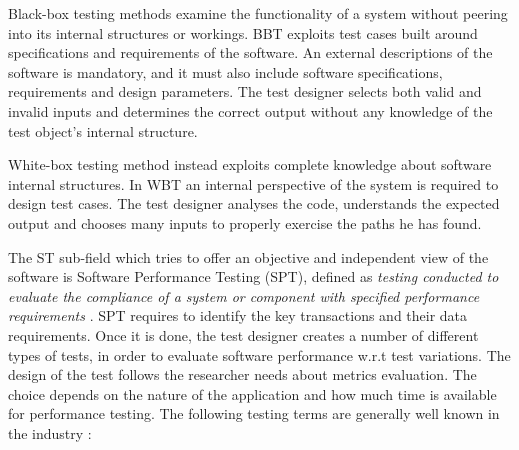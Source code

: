 Black-box testing  methods  examine the functionality of a system without peering into its internal structures or workings. BBT exploits test cases built around specifications and requirements of the software. An external descriptions of the software is mandatory, and it must also include software specifications, requirements and design parameters.  The test designer selects both valid and invalid inputs and determines the correct output without any knowledge of the test object's internal structure.

White-box testing  method instead exploits complete knowledge about software internal structures. In WBT an internal perspective of the system is required to design test cases. The test designer analyses the code, understands the expected output and chooses many inputs to properly exercise the paths he has found. 

The ST sub-field which tries to offer an objective and independent view of the software is Software Performance Testing (SPT), defined as  \textit{testing conducted to evaluate the compliance of a system or component with specified performance requirements} \cite{IEEEStd610.12-1990:glossary}. SPT requires to identify the key transactions and their data requirements. Once it is done, the test designer creates a number of different types of tests, in order to evaluate software performance w.r.t test variations. The design of the test follows the researcher needs about metrics evaluation. The choice depends on the nature of the application and how much time is available for performance testing. The following testing terms are generally well known in the industry \cite{Molyneaux:2009:AAP:1550832}:

